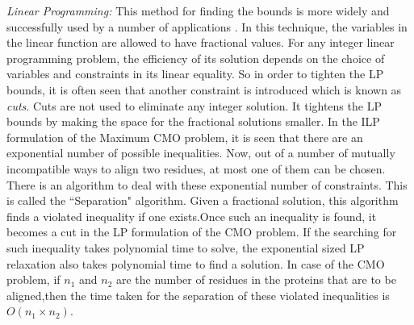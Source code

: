 \begin{noindlist}
\item {\it Linear Programming:} This method for finding the bounds is more widely and successfully used by a number of applications \citep{anmy11}. In this technique, the variables in the linear function are allowed to have fractional values. For any integer linear programming problem, the efficiency of its solution depends on the choice of variables and constraints in its linear equality. So in order to tighten the LP bounds, it is often seen that another constraint is introduced which is known as {\it cuts}. Cuts are not used to eliminate any integer solution. It tightens the LP bounds by making the space for the fractional solutions smaller. In the ILP formulation of the Maximum CMO problem, it is seen that there are an exponential number of possible inequalities. Now, out of a number of mutually incompatible ways to align two residues, at most one of them can be chosen. There is an algorithm to deal with these exponential number of constraints. This is called the ``Separation" algorithm. Given a fractional solution, this algorithm finds a violated inequality if one exists.Once such an inequality is found, it becomes a cut in the LP formulation of the CMO problem. If the searching for such inequality takes polynomial time to solve, the exponential sized LP relaxation also takes polynomial time to find a solution. In case of the CMO problem, if $n_1$ and $n_2$ are the number of residues in the proteins that are to be aligned,then the time taken for the separation of these violated inequalities is $O(n_1\times n_2)$.


\end{noindlist}
